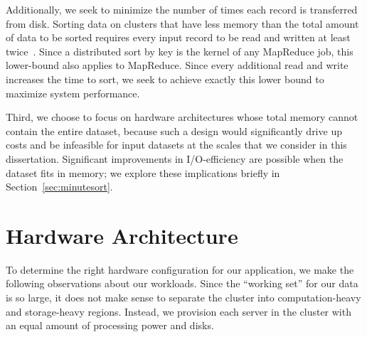 Additionally, we seek to minimize the number of times each record is
transferred from disk.  Sorting data on clusters that have less memory than the
total amount of data to be sorted requires every input record to be read and
written at least twice~\cite{sort-io}.  Since a distributed sort by key is the
kernel of any MapReduce job, this lower-bound also applies to MapReduce. Since
every additional read and write increases the time to sort, we seek to achieve
exactly this lower bound to maximize system performance.

Third, we choose to focus on hardware architectures whose total memory cannot
contain the entire dataset, because such a design would significantly drive up
costs and be infeasible for input datasets at the scales that we consider in
this dissertation. Significant improvements in I/O-efficiency are possible when
the dataset fits in memory; we explore these implications briefly in
Section~\ref{sec:minutesort}.

\section{Hardware Architecture}

To determine the right hardware configuration for our application, we make the
following observations about our workloads. Since the ``working set'' for our
data is so large, it does not make sense to separate the cluster into
computation-heavy and storage-heavy regions. Instead, we provision each server
in the cluster with an equal amount of processing power and disks.

